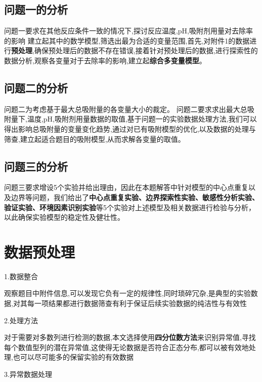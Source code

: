 \documentclass[AutoFakeBold]{ctexart}
\begin{document}
	\subsection{问题一的分析}
	\songti{}问题一要求在其他反应条件一致的情况下,探讨反应温度,pH,吸附剂用量对去除率的影响
	建立起其中的数学模型,筛选出最为合适的变量范围,首先,对附件1的数据进行\textbf{预处理},确保预处理后的数据不存在错误,接着针对预处理后的数据,进行探索性的数据分析,观察各变量对于去除率的影响,建立起\textbf{综合多变量模型}。
	\subsection{问题二的分析}
	\songti{}问题二为考虑基于最大总吸附量的各变量大小的裁定。
	问题二要求求出最大总吸附量下,温度,pH,吸附剂用量数据的取值,基于问题一的实验数据处理方法,我们可以得出影响总吸附量的变量变化趋势,通过对已有吸附模型的优化,以及数据的处理与筛查,建立起适合题目的吸附模型,从而求解各变量的取值。
	\subsection{问题三的分析}
	\songti{}问题三要求增设5个实验并给出理由，因此在本题解答中针对模型的中心点重复以及边界等问题，我们给出了\textbf{中心点重复实验、边界探索性实验、敏感性分析实验、验证实验、环境因素识别实验}等5个实验对上述模型及相关数据进行检验与分析，以此确保实验模型的稳定性及健壮性。
		
	\section{数据预处理}
	1.数据整合
	
	观察题目中附件信息,可以发现它负有一定的规律性,同时琐碎冗杂,是典型的实验数据,对其每一项结果都进行数据筛查有利于保证后续实验数据的纯洁性与有效性
	
	2.处理方法
	
	对于需要对多数列进行检测的数据,本文选择使用\textbf{四分位数方法}\cite{张云华2009统计学中四分位数的计算}来识别异常值,寻找每个数值型列的潜在异常值,这使得无论数据是否符合正态分布,都可以被有效地处理,也可以尽可能多的保留实验的有效数据
	
	3.异常数据处理
	
\end{document}
